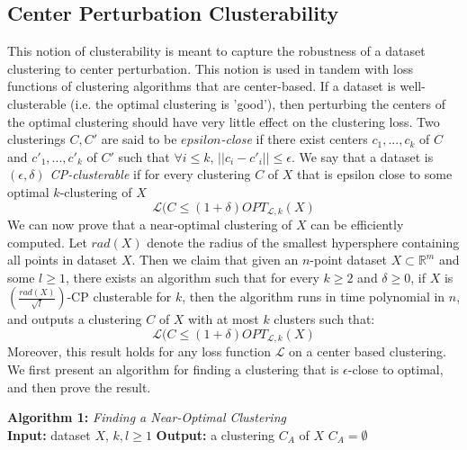     \subsection*{Center Perturbation Clusterability}
    This notion of clusterability is meant to capture the robustness of a dataset clustering to center perturbation. This notion is used in tandem with loss functions of clustering algorithms that are center-based. If a dataset is well-clusterable (i.e. the optimal clustering is 'good'), then perturbing the centers of the optimal clustering should have very little effect on the clustering loss. Two clusterings $C,C'$ are said to be \textit{$epsilon$-close} if there exist centers $c_1,...,c_k$ of $C$ and $c'_1,...,c'_k$ of $C'$ such that $\forall i\leq k$, $||c_i-c'_i||\leq \epsilon$. We say that a dataset is \textit{$(\epsilon,\delta)$ CP-clusterable} if for every clustering $C$ of $X$ that is epsilon close to some optimal $k$-clustering of $X$
    $$\mathcal{L}(C \leq (1+\delta)OPT_{\mathcal{L},k}(X)$$
    We can now prove that a near-optimal clustering of $X$ can be efficiently computed. Let $rad(X)$ denote the radius of the smallest hypersphere containing all points in dataset $X$. Then we claim that given an $n$-point dataset $X\subset \mathbb{R}^m$ and some $l\geq 1$, there exists an algorithm such that for every $k\geq 2$ and $\delta \geq 0$, if $X$ is $(\frac{rad(X)}{\sqrt{l}})$-CP clusterable for $k$, then the algorithm runs in time polynomial in $n$, and outputs a clustering $C$ of $X$ with at most $k$ clusters such that:
    $$\mathcal{L}(C \leq (1+\delta)OPT_{\mathcal{L},k}(X)$$
    Moreover, this result holds for any loss function $\mathcal{L}$ on a center based clustering. We first present an algorithm for finding a clustering that is $\epsilon$-close to optimal, and then prove the result.
    
    \begin{algorithm}[H]
    \noindent \textbf{Algorithm 1:} \textit{Finding a Near-Optimal Clustering}\\
    \textbf{Input:} dataset $X$, $k,l\geq1$\;
    \textbf{Output:} a clustering $C_A$ of $X$\;
    $C_A = \emptyset$\;
    
    \begin{algorithmic}
        \ENDFOR
    \end{algorithmic}
    \end{algorithm}
    

